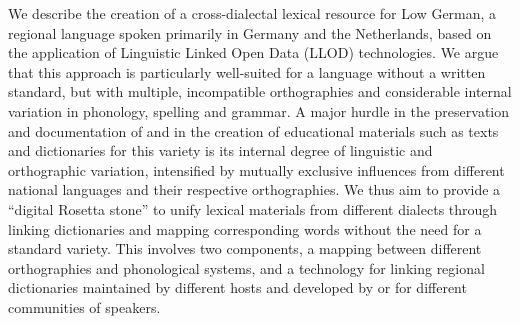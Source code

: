 We describe the creation of a cross-dialectal lexical resource for Low German, a regional language spoken primarily in Germany and the Netherlands, based on the application of Linguistic Linked Open Data (LLOD) technologies. We argue that this approach is particularly well-suited for a language without a written standard, but with multiple, incompatible orthographies and considerable internal variation in phonology, spelling and grammar. A major hurdle in the preservation and documentation of and in the creation of educational materials such as texts and dictionaries for this variety is its internal degree of linguistic and orthographic variation, intensified by mutually exclusive influences from different national languages and their respective orthographies. %
We thus aim to provide a ``digital Rosetta stone'' to unify lexical materials from different dialects through linking dictionaries and mapping corresponding words without the need for a standard variety. This involves two components, a mapping between different orthographies and phonological systems, and a technology for linking regional dictionaries maintained by different hosts and developed by or for different communities of speakers.
